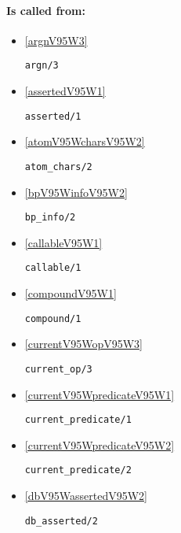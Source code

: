 \paragraph{Is called from:} 
\begin{itemize}
\item \ref{argnV95W3} 
\begin{verbatim}
argn/3
\end{verbatim}

\item \ref{assertedV95W1} 
\begin{verbatim}
asserted/1
\end{verbatim}

\item \ref{atomV95WcharsV95W2} 
\begin{verbatim}
atom_chars/2
\end{verbatim}

\item \ref{bpV95WinfoV95W2} 
\begin{verbatim}
bp_info/2
\end{verbatim}

\item \ref{callableV95W1} 
\begin{verbatim}
callable/1
\end{verbatim}

\item \ref{compoundV95W1} 
\begin{verbatim}
compound/1
\end{verbatim}

\item \ref{currentV95WopV95W3} 
\begin{verbatim}
current_op/3
\end{verbatim}

\item \ref{currentV95WpredicateV95W1} 
\begin{verbatim}
current_predicate/1
\end{verbatim}

\item \ref{currentV95WpredicateV95W2} 
\begin{verbatim}
current_predicate/2
\end{verbatim}

\item \ref{dbV95WassertedV95W2} 
\begin{verbatim}
db_asserted/2
\end{verbatim}


\end{itemize}
